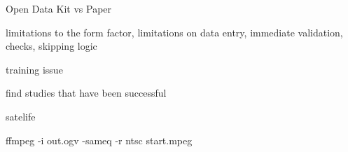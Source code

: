 Open Data Kit vs Paper

limitations to the form factor, limitations on data entry, immediate validation, checks, skipping logic

training issue

find studies that have been successful

satelife


ffmpeg -i out.ogv -sameq -r ntsc start.mpeg
